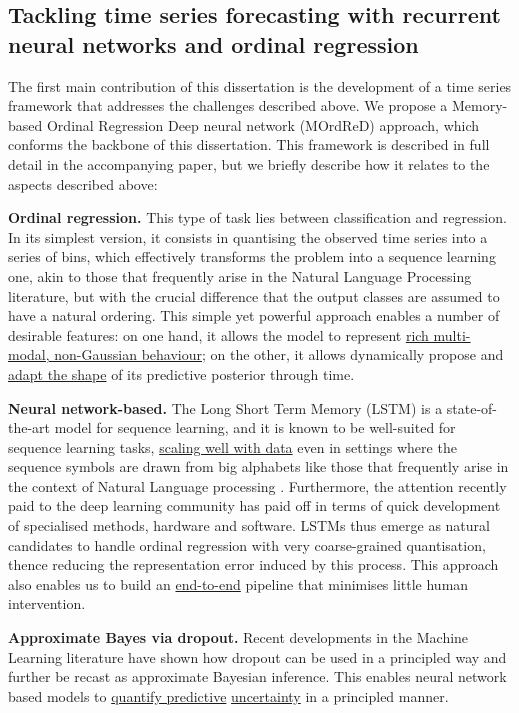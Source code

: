 \documentclass[pdftex,12pt,a4paper]{article}
\theoremstyle{definition}
\theoremstyle{remark}
\begin{document}
\subsection{Tackling time series forecasting with recurrent neural networks and ordinal regression}
The first main contribution of this dissertation is the development of a time series framework that addresses the challenges described above. We propose a Memory-based Ordinal Regression Deep neural network (MOrdReD) approach, which conforms the backbone of this dissertation. This framework is described in full detail in the accompanying paper, but we briefly describe how it relates to the aspects described above:

\textbf{Ordinal regression.} This type of task lies between classification and regression. In its simplest version, it consists in quantising the observed time series into a series of bins, which effectively transforms the problem into a sequence learning one, akin to those that frequently arise in the Natural Language Processing literature, but with the crucial difference that the output classes are assumed to have a natural ordering. This simple yet powerful approach enables a number of desirable features: on one hand, it allows the model to represent \underline{rich multi-modal, non-Gaussian behaviour}; on the other, it allows dynamically propose and \underline{adapt the shape} of its predictive posterior through time.

\textbf{Neural network-based.} The Long Short Term Memory (LSTM) is a state-of-the-art model for sequence learning, and it is known to be well-suited for sequence learning tasks, \underline{scaling well with data} even in settings where the sequence symbols are drawn from big alphabets like those that frequently arise in the context of Natural Language processing \citep{Sutskever2014,Xu2014,graves2005}. Furthermore, the attention recently paid to the deep learning community has paid off in terms of quick development of specialised methods, hardware and software. LSTMs thus emerge as natural candidates to handle ordinal regression with very coarse-grained quantisation, thence reducing the representation error induced by this process. This approach also enables us to build an \underline{end-to-end} pipeline that minimises little human intervention.

\textbf{Approximate Bayes via dropout.} Recent developments in the Machine Learning literature have shown how dropout \citep{srivastava2014dropout} can be used in a principled way and further be recast as approximate Bayesian inference. This enables neural network based models to \underline{quantify predictive} \underline{uncertainty} in a principled manner.
\end{document}
